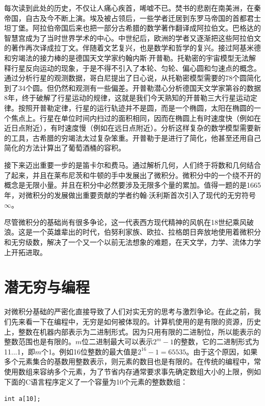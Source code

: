 \documentclass{article}
\begin{document}
每次读到此处的历史，不仅让人痛心疾首，唏嘘不已。焚书的悲剧在南美洲，在秦帝国，自古及今不断上演。埃及被占领后，一些学者迁居到东罗马帝国的首都君士坦丁堡。阿拉伯帝国后来也把一部分古希腊的数学著作翻译成阿拉伯文。巴格达的智慧宫成为了当时世界学术的中心。中世纪后，欧洲的学者又逐渐把这些阿拉伯文的著作再次译成拉丁文。伴随着文艺复兴，也是数学和哲学的复兴。接过阿基米德和穷竭法的接力棒的是德国天文学家约翰内斯$\cdot$开普勒。托勒密的宇宙模型无法解释行星反向运动的现象，于是不得不引入了本轮、匀轮、偏心圆和匀速点的概念。通过分析行星的观测数据，哥白尼提出了日心说，从托勒密模型需要的78个圆简化到了34个圆。但仍然和观测有一些偏差。开普勒潜心分析德国天文学家第谷的数据8年，终于破解了行星运动的规律，这就是我们今天熟知的开普勒三大行星运动定律。按照开普勒定律，行星的运行轨迹并不是圆，而是一个椭圆，太阳在椭圆的一个焦点上。行星在单位时间内扫过的面积相同，因而在椭圆上有时速度快（例如在近日点附近），有时速度慢（例如在远日点附近）。分析这样复杂的数学模型需要新的工具，古希腊的穷竭法太过复杂笨重。开普勒于是进行了简化，他甚至还用自己简化的方法计算出了葡萄酒桶的容积。

接下来迈出重要一步的是笛卡尔和费马。通过解析几何，人们终于将数和几何结合了起来，并且在莱布尼茨和牛顿的手中发展出了微积分。微积分中的一个绕不开的概念是无限小量。并且在积分中必然要涉及无限多个量的累加。值得一题的是1665年，对微积分的发展做出重要贡献的学者约翰$\cdot$沃利斯首次引入了现代的无穷符号$\infty$。

尽管微积分的基础尚有很多争论，这一代表西方现代精神的风帆在18世纪乘风破浪。这是一个英雄辈出的时代，伯努利家族、欧拉、拉格朗日奔放地使用着微积分和无穷级数，解决了一个又一个以前无法想象的难题，在天文学，力学、流体力学上开拓进取。

\section{潜无穷与编程}
对微积分基础的严密化直接导致了人们对实无穷的思考与激烈争论。在此之前，我们先来看一下在编程中，无穷是如何被体现的。计算机使用的是有限的资源，历史上，整数在机器内部表示为二进制形式。因为只用有限的二进制位，所以能表示的整数范围也是有限的。$m$位二进制最大可以表示$2^m-1$的整数，它的二进制形式为11...1，即$m$个1。例如16位整数的最大值是$2^{16}-1 = 65535$。由于这个原因，如果多个元素集合的基数用整数表示，则元素的数目也是有限的。在传统的编程中，常使用数组来容纳多个元素，为了节省内存通常要求事先确定数组大小的上限，例如下面的C语言程序定义了一个容量为10个元素的整数数组：

\begin{verbatim}
int a[10];
\end{verbatim}
\end{document}
